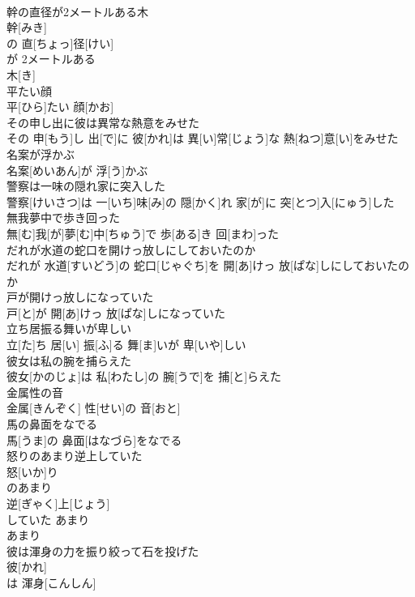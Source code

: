 \documentclass[8pt]{extreport}
\begin{document}
\begin{CJK}{UTF8}{min}
\\	幹の直径が2メートルある木	
\\	幹[みき]
\\	の 直[ちょっ]径[けい]
\\	が 2メートルある 
\\	木[き]
\\	平たい顔	
\\	平[ひら]たい 顔[かお]
\\	その申し出に彼は異常な熱意をみせた	
\\	その 申[もう]し 出[で]に 彼[かれ]は 異[い]常[じょう]な 熱[ねつ]意[い]をみせた
\\	名案が浮かぶ	
\\	名案[めいあん]が 浮[う]かぶ
\\	警察は一味の隠れ家に突入した	
\\	警察[けいさつ]は 一[いち]味[み]の 隠[かく]れ 家[が]に 突[とつ]入[にゅう]した
\\	無我夢中で歩き回った	
\\	無[む]我[が]夢[む]中[ちゅう]で 歩[ある]き 回[まわ]った
\\	だれが水道の蛇口を開けっ放しにしておいたのか	
\\	だれが 水道[すいどう]の 蛇口[じゃぐち]を 開[あ]けっ 放[ぱな]しにしておいたのか
\\	戸が開けっ放しになっていた	
\\	戸[と]が 開[あ]けっ 放[ぱな]しになっていた
\\	立ち居振る舞いが卑しい	
\\	立[た]ち 居[い] 振[ふ]る 舞[ま]いが 卑[いや]しい
\\	彼女は私の腕を捕らえた	
\\	彼女[かのじょ]は 私[わたし]の 腕[うで]を 捕[と]らえた
\\	金属性の音	
\\	金属[きんぞく] 性[せい]の 音[おと]
\\	馬の鼻面をなでる	
\\	馬[うま]の 鼻面[はなづら]をなでる
\\	怒りのあまり逆上していた	
\\	怒[いか]り 
\\	のあまり 
\\	逆[ぎゃく]上[じょう]
\\	していた あまり 
\\	あまり 
\\	彼は渾身の力を振り絞って石を投げた	
\\	彼[かれ]
\\	は 渾身[こんしん]

\end{CJK}
\end{document}
